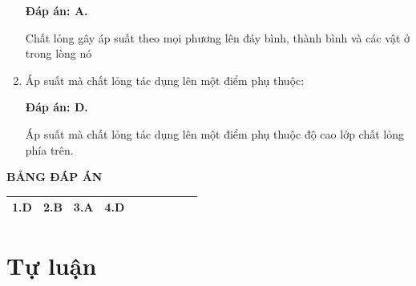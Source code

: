 \begin{enumerate}[label=\bfseries Câu \arabic*:]
	\hideall
	{	
		\textbf{Đáp án: A.}
		
		Chất lỏng gây áp suất theo mọi phương lên đáy bình, thành bình và các vật ở trong lòng nó
	}
	\item {}
	
	
	{Áp suất mà chất lỏng tác dụng lên một điểm phụ thuộc:
	}
	
	\hideall
	{	
		\textbf{Đáp án: D.}
		
		Áp suất mà chất lỏng tác dụng lên một điểm phụ thuộc độ cao lớp chất lỏng phía trên.
	}

\end{enumerate}
\hideall
{
	\begin{center}
		\textbf{BẢNG ĐÁP ÁN}
	\end{center}
	\begin{center}
		\begin{tabular}{|m{2.8em}|m{2.8em}|m{2.8em}|m{2.8em}|m{2.8em}|m{2.8em}|m{2.8em}|m{2.8em}|m{2.8em}|m{2.8em}|}
			\hline
			1.D  & 2.B  & 3.A  & 4.D  &  &   &  &   &  &   \\
			\hline
		
		\end{tabular}
	\end{center}
}
\section{Tự luận}

